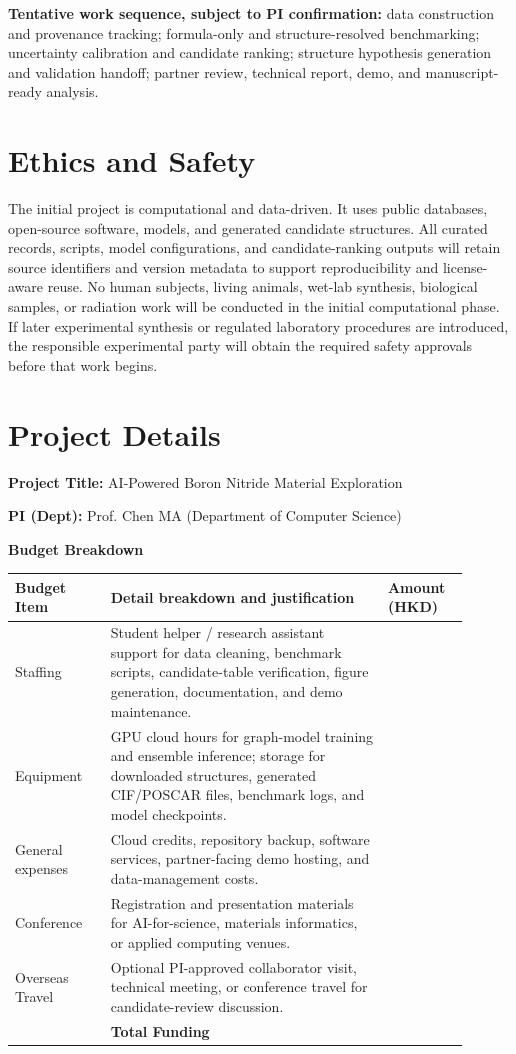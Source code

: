 \documentclass[10pt,a4paper]{article}
\newcommand{\blank}[1][7em]{\colorbox{yellow!35}{\rule{0pt}{1.05em}\hspace{#1}}}
\begin{document}
\textbf{Tentative work sequence, subject to PI confirmation:}
data construction and provenance tracking; formula-only and structure-resolved benchmarking; uncertainty calibration and candidate ranking; structure hypothesis generation and validation handoff; partner review, technical report, demo, and manuscript-ready analysis.

\section{Ethics and Safety}
The initial project is computational and data-driven. It uses public databases, open-source software, models, and generated candidate structures. All curated records, scripts, model configurations, and candidate-ranking outputs will retain source identifiers and version metadata to support reproducibility and license-aware reuse. No human subjects, living animals, wet-lab synthesis, biological samples, or radiation work will be conducted in the initial computational phase. If later experimental synthesis or regulated laboratory procedures are introduced, the responsible experimental party will obtain the required safety approvals before that work begins.

\section*{Project Details}
\textbf{Project Title:} AI-Powered Boron Nitride Material Exploration

\textbf{PI (Dept):} Prof. Chen MA (Department of Computer Science)

\textbf{Budget Breakdown}
\begin{center}
\small
\begin{tabular}{>{\raggedright\arraybackslash}p{0.19\linewidth}>{\raggedright\arraybackslash}p{0.55\linewidth}>{\raggedright\arraybackslash}p{0.16\linewidth}}
\toprule
\textbf{Budget Item} & \textbf{Detail breakdown and justification} & \textbf{Amount (HKD)}\\
\midrule
Staffing & Student helper / research assistant support for data cleaning, benchmark scripts, candidate-table verification, figure generation, documentation, and demo maintenance. & \blank\\
Equipment & GPU cloud hours for graph-model training and ensemble inference; storage for downloaded structures, generated CIF/POSCAR files, benchmark logs, and model checkpoints. & \blank\\
General expenses & Cloud credits, repository backup, software services, partner-facing demo hosting, and data-management costs. & \blank\\
Conference & Registration and presentation materials for AI-for-science, materials informatics, or applied computing venues. & \blank\\
Overseas Travel & Optional PI-approved collaborator visit, technical meeting, or conference travel for candidate-review discussion. & \blank\\
\midrule
 & \textbf{Total Funding} & \blank\\
\bottomrule
\end{tabular}
\end{center}
\end{document}
